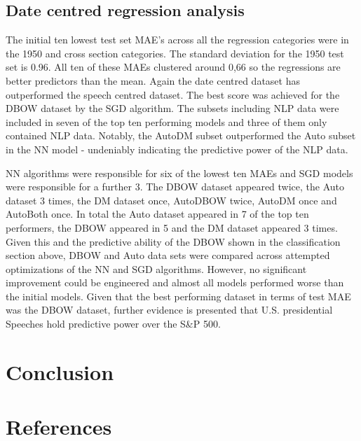 \documentclass[11pt,preprint, authoryear]{elsarticle}
\numberwithin{equation}{section}
\numberwithin{figure}{section}
\numberwithin{table}{section}
\begin{document}
\hypertarget{date-centred-regression-analysis}{%
\subsection{Date centred regression
analysis}\label{date-centred-regression-analysis}}

The initial ten lowest test set MAE's across all the regression
categories were in the 1950 and cross section categories. The standard
deviation for the 1950 test set is 0.96. All ten of these MAEs clustered
around 0,66 so the regressions are better predictors than the mean.
Again the date centred dataset has outperformed the speech centred
dataset. The best score was achieved for the DBOW dataset by the SGD
algorithm. The subsets including NLP data were included in seven of the
top ten performing models and three of them only contained NLP data.
Notably, the AutoDM subset outperformed the Auto subset in the NN model
- undeniably indicating the predictive power of the NLP data.

NN algorithms were responsible for six of the lowest ten MAEs and SGD
models were responsible for a further 3. The DBOW dataset appeared
twice, the Auto dataset 3 times, the DM dataset once, AutoDBOW twice,
AutoDM once and AutoBoth once. In total the Auto dataset appeared in 7
of the top ten performers, the DBOW appeared in 5 and the DM dataset
appeared 3 times. Given this and the predictive ability of the DBOW
shown in the classification section above, DBOW and Auto data sets were
compared across attempted optimizations of the NN and SGD algorithms.
However, no significant improvement could be engineered and almost all
models performed worse than the initial models. Given that the best
performing dataset in terms of test MAE was the DBOW dataset, further
evidence is presented that U.S. presidential Speeches hold predictive
power over the S\&P 500.

\hypertarget{conclusion}{%
\section{Conclusion}\label{conclusion}}

\newpage

\hypertarget{references}{%
\section*{References}\label{references}}
\end{document}
